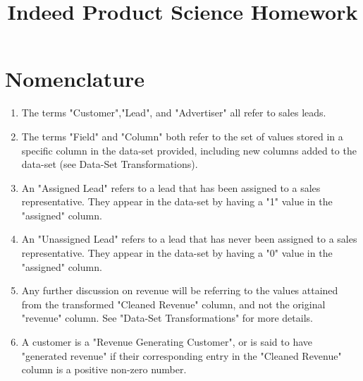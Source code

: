 \documentclass[11pt]{article}
\title{Indeed Product Science Homework}
\begin{document}
\maketitle

\newpage

\tableofcontents

\newpage



\section{Nomenclature}
\begin{enumerate}
    \item The terms "Customer","Lead", and "Advertiser" all refer to sales leads.
    \item The terms "Field" and "Column" both refer to the set of values stored in a specific column in the data-set provided, including new columns added to the data-set (see Data-Set Transformations).
    \item An "Assigned Lead" refers to a lead that has been assigned to a sales representative. They appear in the data-set by having a "1" value in the "assigned" column.
     \item An "Unassigned Lead" refers to a lead that has never been assigned to a sales representative. They appear in the data-set by having a "0" value in the "assigned" column.
    \item Any further discussion on revenue will be referring to the values attained from the transformed "Cleaned Revenue" column, and not the original "revenue" column. See "Data-Set Transformations" for more details.
    \item A customer is a "Revenue Generating Customer", or is said to have "generated revenue" if their corresponding entry in the "Cleaned Revenue" column is a positive non-zero number.
\end{enumerate}
\end{document}
